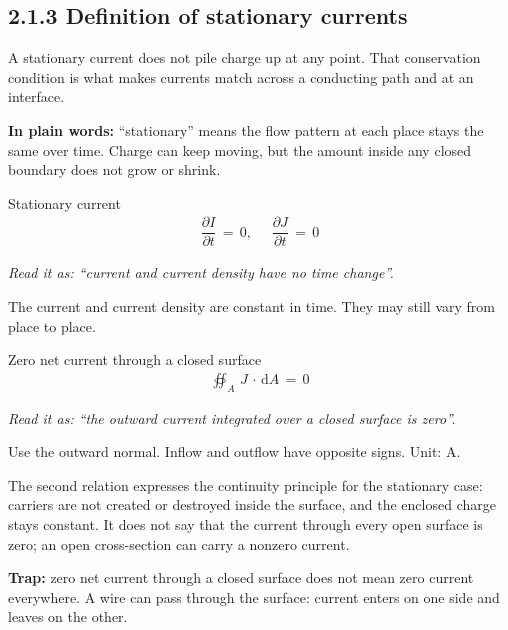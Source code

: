 \documentclass[11pt]{article}
\begin{document}
\begin{keepsection}
\section{2.1.3 Definition of stationary currents}

A stationary current does not pile charge up at any point. That conservation condition is what makes currents match across a conducting path and at an interface.

\begin{plainbox}\textbf{In plain words:} “stationary” means the flow pattern at each place stays the same over time. Charge can keep moving, but the amount inside any closed boundary does not grow or shrink.\end{plainbox}

\begin{equationcard}{Stationary current}
\[ \begin{gathered} \dfrac{∂{I}}{∂{t}}\, =\, 0,\, \quad \, \dfrac{∂{J}}{∂{t}}\, =\, 0 \end{gathered} \]
{\small \emph{Read it as: “current and current density have no time change”.}\par The current and current density are constant in time. They may still vary from place to place.}
\end{equationcard}

\begin{equationcard}{Zero net current through a closed surface}
\[ \begin{gathered} \oiint_{{A}} \, {J}\, \cdot \, \mathrm{d}{A}\, =\, 0 \end{gathered} \]
{\small \emph{Read it as: “the outward current integrated over a closed surface is zero”.}\par Use the outward normal. Inflow and outflow have opposite signs. Unit: A.}
\end{equationcard}

The second relation expresses the continuity principle for the stationary case: carriers are not created or destroyed inside the surface, and the enclosed charge stays constant. It does not say that the current through every open surface is zero; an open cross-section can carry a nonzero current.

\begin{notebox}\textbf{Trap:} zero net current through a closed surface does not mean zero current everywhere. A wire can pass through the surface: current enters on one side and leaves on the other.\end{notebox}


\end{keepsection}
\end{document}
